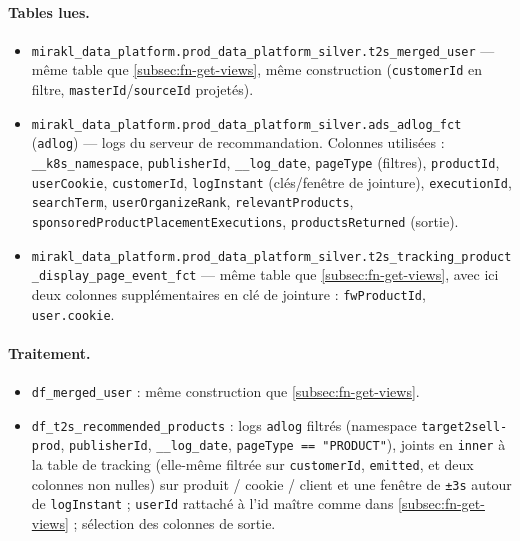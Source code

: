 \documentclass[11pt,a4paper]{article}
\newcommand{\code}[1]{\texttt{\small #1}}
\begin{document}
\paragraph{Tables lues.}
\begin{itemize}[nosep,leftmargin=*]
  \item \code{mirakl\_data\_platform.prod\_data\_platform\_silver.t2s\_merged\_user}
        --- même table que \ref{subsec:fn-get-views}, même construction
        (\code{customerId} en filtre, \code{masterId}/\code{sourceId} projetés).
  \item \code{mirakl\_data\_platform.prod\_data\_platform\_silver.ads\_adlog\_fct}
        (\code{adlog}) --- logs du serveur de recommandation. Colonnes utilisées :
        \code{\_\_k8s\_namespace}, \code{publisherId}, \code{\_\_log\_date},
        \code{pageType} (filtres), \code{productId}, \code{userCookie},
        \code{customerId}, \code{logInstant} (clés/fenêtre de jointure),
        \code{executionId}, \code{searchTerm}, \code{userOrganizeRank},
        \code{relevantProducts}, \code{sponsoredProductPlacementExecutions},
        \code{productsReturned} (sortie).
  \item \code{mirakl\_data\_platform.prod\_data\_platform\_silver.t2s\_tracking\_product\_display\_page\_event\_fct}
        --- même table que \ref{subsec:fn-get-views}, avec ici deux colonnes
        supplémentaires en clé de jointure : \code{fwProductId},
        \code{user.cookie}.
\end{itemize}

\paragraph{Traitement.}
\begin{itemize}[nosep,leftmargin=*]
  \item \code{df\_merged\_user} : même construction que
        \ref{subsec:fn-get-views}.
  \item \code{df\_t2s\_recommended\_products} : logs \code{adlog} filtrés
        (namespace \code{target2sell-prod}, \code{publisherId},
        \code{\_\_log\_date}, \code{pageType == "PRODUCT"}), joints en
        \code{inner} à la table de tracking (elle-même filtrée sur
        \code{customerId}, \code{emitted}, et deux colonnes non nulles) sur
        produit / cookie / client et une fenêtre de \code{±3s} autour de
        \code{logInstant} ; \code{userId} rattaché à l'id maître comme dans
        \ref{subsec:fn-get-views} ; sélection des colonnes de sortie.
\end{itemize}
\end{document}
